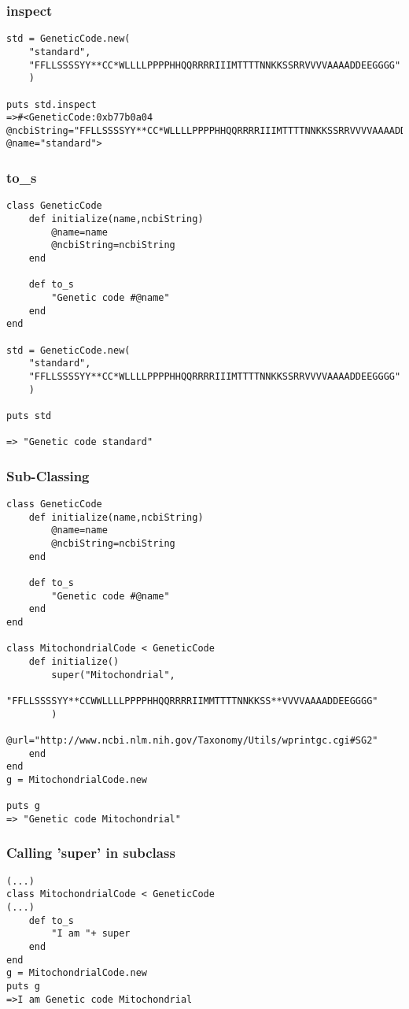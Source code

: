 \documentclass{article}
\begin{document}
\subsubsection{inspect}
\begin{lstlisting}
std = GeneticCode.new(
	"standard",
	"FFLLSSSSYY**CC*WLLLLPPPPHHQQRRRRIIIMTTTTNNKKSSRRVVVVAAAADDEEGGGG"
	)

puts std.inspect
=>#<GeneticCode:0xb77b0a04 @ncbiString="FFLLSSSSYY**CC*WLLLLPPPPHHQQRRRRIIIMTTTTNNKKSSRRVVVVAAAADDEEGGGG", @name="standard">
\end{lstlisting}


\subsubsection{to\_s}
\begin{lstlisting}
class GeneticCode
	def initialize(name,ncbiString)
		@name=name
		@ncbiString=ncbiString
	end
	
	def to_s
		"Genetic code #@name"
	end
end

std = GeneticCode.new(
	"standard",
	"FFLLSSSSYY**CC*WLLLLPPPPHHQQRRRRIIIMTTTTNNKKSSRRVVVVAAAADDEEGGGG"
	)

puts std

=> "Genetic code standard"
\end{lstlisting}
\subsubsection{Sub-Classing}
\begin{lstlisting}
class GeneticCode
	def initialize(name,ncbiString)
		@name=name
		@ncbiString=ncbiString
	end
	
	def to_s
		"Genetic code #@name"
	end
end

class MitochondrialCode < GeneticCode
	def initialize()
		super("Mitochondrial",
		"FFLLSSSSYY**CCWWLLLLPPPPHHQQRRRRIIMMTTTTNNKKSS**VVVVAAAADDEEGGGG"
		)
		@url="http://www.ncbi.nlm.nih.gov/Taxonomy/Utils/wprintgc.cgi#SG2"
	end
end
g = MitochondrialCode.new

puts g
=> "Genetic code Mitochondrial"
\end{lstlisting}
\subsubsection{Calling 'super' in subclass}
\begin{lstlisting}
(...)
class MitochondrialCode < GeneticCode
(...)
	def to_s
		"I am "+ super
	end
end
g = MitochondrialCode.new
puts g
=>I am Genetic code Mitochondrial
\end{lstlisting}
\end{document}
